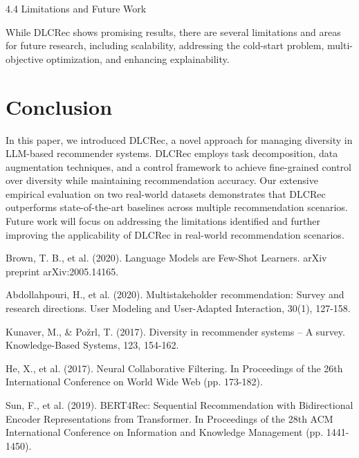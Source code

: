 \documentclass[12pt,letterpaper]{article}
\begin{document}
4.4 Limitations and Future Work

While DLCRec shows promising results, there are several limitations and areas for future research, including scalability, addressing the cold-start problem, multi-objective optimization, and enhancing explainability.

\section{Conclusion}

In this paper, we introduced DLCRec, a novel approach for managing diversity in LLM-based recommender systems. DLCRec employs task decomposition, data augmentation techniques, and a control framework to achieve fine-grained control over diversity while maintaining recommendation accuracy. Our extensive empirical evaluation on two real-world datasets demonstrates that DLCRec outperforms state-of-the-art baselines across multiple recommendation scenarios. Future work will focus on addressing the limitations identified and further improving the applicability of DLCRec in real-world recommendation scenarios.


\begin{thebibliography}{99}

Brown, T. B., et al. (2020). Language Models are Few-Shot Learners. arXiv preprint arXiv:2005.14165.

Abdollahpouri, H., et al. (2020). Multistakeholder recommendation: Survey and research directions. User Modeling and User-Adapted Interaction, 30(1), 127-158.

Kunaver, M., & Požrl, T. (2017). Diversity in recommender systems – A survey. Knowledge-Based Systems, 123, 154-162.

He, X., et al. (2017). Neural Collaborative Filtering. In Proceedings of the 26th International Conference on World Wide Web (pp. 173-182).

Sun, F., et al. (2019). BERT4Rec: Sequential Recommendation with Bidirectional Encoder Representations from Transformer. In Proceedings of the 28th ACM International Conference on Information and Knowledge Management (pp. 1441-1450).

\end{thebibliography}
\end{document}
